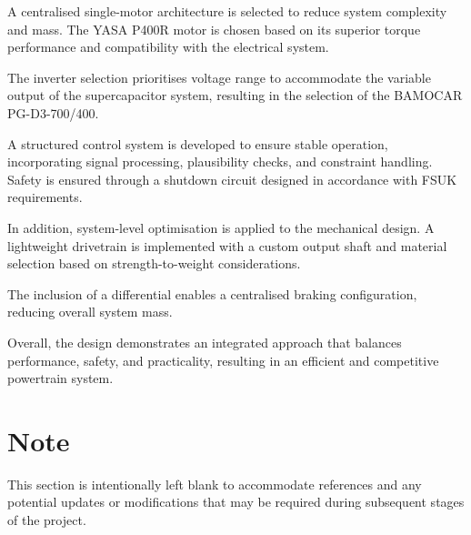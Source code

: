 A centralised single-motor architecture is selected to reduce system complexity and mass. The YASA P400R motor is chosen based on its superior torque performance and compatibility with the electrical system.

The inverter selection prioritises voltage range to accommodate the variable output of the supercapacitor system, resulting in the selection of the BAMOCAR PG-D3-700/400.

A structured control system is developed to ensure stable operation, incorporating signal processing, plausibility checks, and constraint handling. Safety is ensured through a shutdown circuit designed in accordance with FSUK requirements.

In addition, system-level optimisation is applied to the mechanical design. A lightweight drivetrain is implemented with a custom output shaft and material selection based on strength-to-weight considerations.

The inclusion of a differential enables a centralised braking configuration, reducing overall system mass.

Overall, the design demonstrates an integrated approach that balances performance, safety, and practicality, resulting in an efficient and competitive powertrain system.

\section*{Note}

This section is intentionally left blank to accommodate references and any potential updates or modifications that may be required during subsequent stages of the project.

\compactbib
